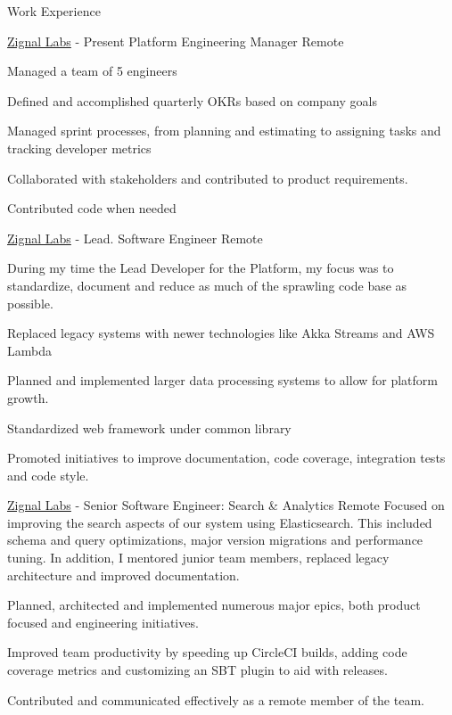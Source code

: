 \documentclass[UKenglish]{resume} %
\begin{document}
\begin{rSection}{Work Experience}
    \begin{rSubsection}
        {\href{https://www.zignallabs.com}{Zignal Labs}}
        {  - Present }
        {Platform Engineering Manager}
        {Remote}

        \item Managed a team of 5 engineers
        \item Defined and accomplished quarterly OKRs based on company goals
        \item Managed sprint processes, from planning and estimating to assigning tasks and tracking developer metrics
        \item Collaborated with stakeholders and contributed to product requirements.
        \item Contributed code when needed

    \end{rSubsection}

    \begin{rSubsection}
        {\href{https://www.zignallabs.com}{Zignal Labs}}
        {  -  }
        {Lead. Software Engineer}
        {Remote}

        During my time the Lead Developer for the Platform, my focus was to standardize, document and reduce as much of the sprawling code base as possible. \par
        \item Replaced legacy systems with newer technologies like Akka Streams and AWS Lambda
        \item Planned and implemented larger data processing systems to allow for platform growth.
        \item Standardized web framework under common library
        \item Promoted initiatives to improve documentation, code coverage, integration tests and code style.
    \end{rSubsection}

    \begin{rSubsection}
        {\href{https://www.zignallabs.com}{Zignal Labs}}
        {  -  }
        {Senior Software Engineer: Search \& Analytics }
        {Remote}
        Focused on improving the search aspects of our system using Elasticsearch. This included schema and query optimizations, major version migrations and performance tuning. In addition, I mentored junior team members, replaced legacy architecture and improved documentation. \par
        \item Planned, architected and implemented numerous major epics, both product focused and engineering initiatives.
        \item Improved team productivity by speeding up CircleCI builds, adding code coverage metrics and customizing an SBT plugin to aid with releases.
        \item Contributed and communicated effectively as a remote member of the team.
    \end{rSubsection}


\end{rSection}
\end{document}
